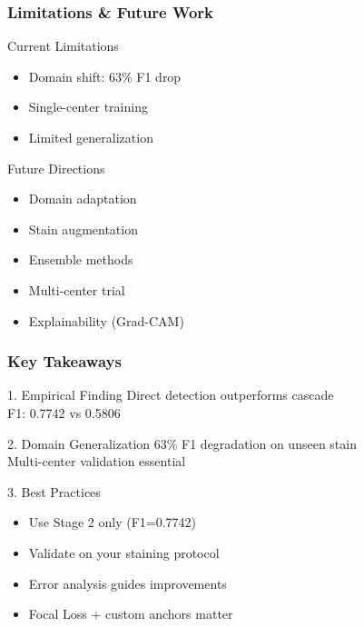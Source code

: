 \documentclass[aspectratio=169,13pt]{beamer}
\begin{document}
\begin{frame}
  \frametitle{Limitations \& Future Work}
            \begin{block}{Current Limitations}
        \begin{itemize}
          \item Domain shift: 63\% F1 drop
          \item Single-center training
          \item Limited generalization
        \end{itemize}
      \end{block}
    
          \begin{block}{Future Directions}
        \begin{itemize}
          \item Domain adaptation
          \item Stain augmentation
          \item Ensemble methods
          \item Multi-center trial
          \item Explainability (Grad-CAM)
        \end{itemize}
      \end{block}
  
\end{frame}

\begin{frame}
  \frametitle{Key Takeaways}
  
  \begin{block}{\large 1. Empirical Finding}
    Direct detection outperforms cascade \\
    F1: 0.7742 vs 0.5806
  \end{block}
  
  \begin{block}{\large 2. Domain Generalization}
    63\% F1 degradation on unseen stain \\
    Multi-center validation essential
  \end{block}
  
  \begin{block}{\large 3. Best Practices}
    \begin{itemize}
      \item Use Stage 2 only (F1=0.7742)
      \item Validate on your staining protocol
      \item Error analysis guides improvements
      \item Focal Loss + custom anchors matter
    \end{itemize}
  \end{block}
\end{frame}
\end{document}
